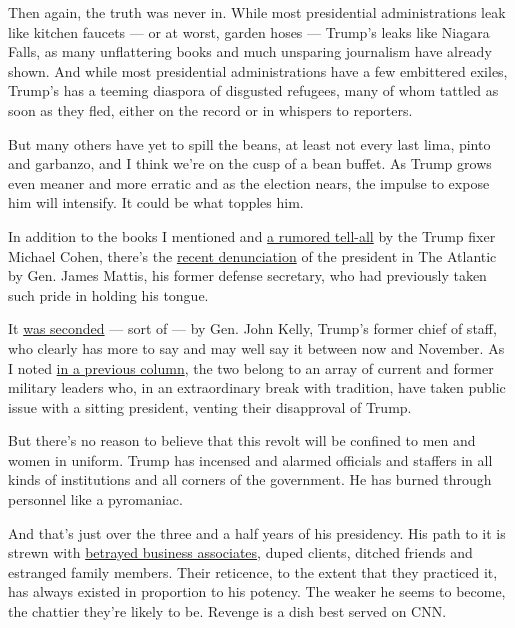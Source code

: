 Then again, the truth was never in. While most presidential
administrations leak like kitchen faucets --- or at worst, garden hoses
--- Trump's leaks like Niagara Falls, as many unflattering books and
much unsparing journalism have already shown. And while most
presidential administrations have a few embittered exiles, Trump's has a
teeming diaspora of disgusted refugees, many of whom tattled as soon as
they fled, either on the record or in whispers to reporters.

But many others have yet to spill the beans, at least not every last
lima, pinto and garbanzo, and I think we're on the cusp of a bean
buffet. As Trump grows even meaner and more erratic and as the election
nears, the impulse to expose him will intensify. It could be what
topples him.

In addition to the books I mentioned and
\href{https://www.thedailybeast.com/michael-cohen-is-writing-a-secret-tell-all-to-spill-the-beans-on-trump}{a
rumored tell-all} by the Trump fixer Michael Cohen, there's the
\href{https://www.theatlantic.com/politics/archive/2020/06/james-mattis-denounces-trump-protests-militarization/612640/}{recent
denunciation} of the president in The Atlantic by Gen. James Mattis, his
former defense secretary, who had previously taken such pride in holding
his tongue.

It
\href{https://www.cbsnews.com/news/john-kelly-trump-military-force-agrees-with-mattis/}{was
seconded} --- sort of --- by Gen. John Kelly, Trump's former chief of
staff, who clearly has more to say and may well say it between now and
November. As I noted
\href{https://www.nytimes.com/2020/06/15/opinion/trump-military.html}{in
a previous column}, the two belong to an array of current and former
military leaders who, in an extraordinary break with tradition, have
taken public issue with a sitting president, venting their disapproval
of Trump.

But there's no reason to believe that this revolt will be confined to
men and women in uniform. Trump has incensed and alarmed officials and
staffers in all kinds of institutions and all corners of the government.
He has burned through personnel like a pyromaniac.

And that's just over the three and a half years of his presidency. His
path to it is strewn with
\href{https://www.wsj.com/articles/donald-trumps-business-plan-left-a-trail-of-unpaid-bills-1465504454}{betrayed
business associates}, duped clients, ditched friends and estranged
family members. Their reticence, to the extent that they practiced it,
has always existed in proportion to his potency. The weaker he seems to
become, the chattier they're likely to be. Revenge is a dish best served
on CNN.

